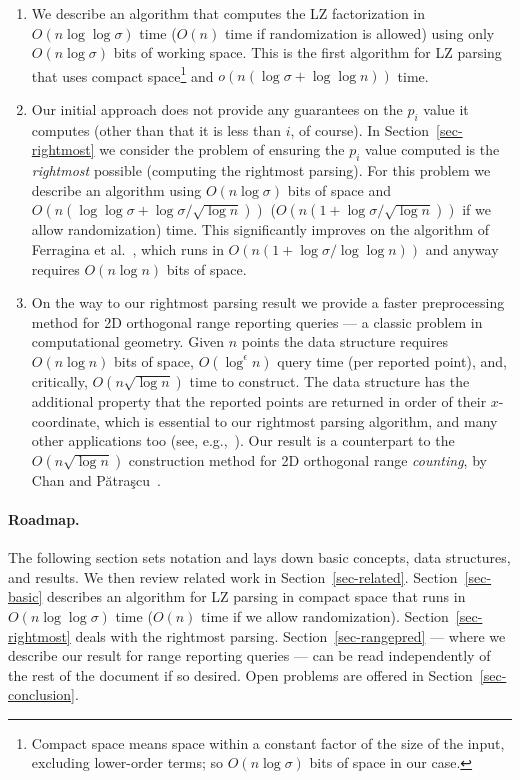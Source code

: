 \documentclass[11pt,runningheads]{llncs}
\begin{document}
\begin{enumerate}
\item We describe an algorithm that computes the LZ factorization in $O(n\log\log\sigma)$
time ($O(n)$ time if randomization is allowed) using only $O(n\log\sigma)$ bits of working space. 
This is the first algorithm for LZ parsing that uses compact space\footnote{Compact space means space within a constant
factor of the size of the input, excluding lower-order terms; so $O(n\log\sigma)$ bits of
space in our case.} and $o(n(\log\sigma+\log\log n))$ time.

\item Our initial approach does not provide any guarantees on the $p_i$
value it computes (other than that it is less than $i$, of course). In Section~\ref{sec-rightmost} 
we consider the problem of ensuring the $p_i$ value computed
is the {\em rightmost} possible (computing the rightmost parsing). For this
problem we describe an algorithm using $O(n\log\sigma)$ bits of space 
and $O(n(\log\log\sigma + \log\sigma/\sqrt{\log n}))$ ($O(n(1 + \log\sigma/\sqrt{\log n}))$ 
if we allow randomization)
time. This significantly improves on the algorithm of Ferragina et al.~\cite{fnv2013},
which runs in $O(n(1 + \log\sigma/\log\log n))$ and anyway requires $O(n\log n)$ bits of space.

\item On the way to our rightmost parsing result we provide a faster
preprocessing method for 2D orthogonal range reporting queries --- 
a classic problem in computational geometry. Given $n$ points 
the data structure requires $O(n\log n)$ bits of space, $O(\log^\epsilon n)$ query time (per reported point), 
and, critically, $O(n\sqrt{\log n})$ time to construct. The data structure 
has the additional property that the reported points are returned in order
of their $x$-coordinate, which is essential to our rightmost parsing algorithm,
and many other applications too (see, e.g.,~\cite{yhw2011,nn2012}). 
Our result is a counterpart to the $O(n\sqrt{\log n})$ 
construction method for 2D orthogonal range {\em counting}, 
by Chan and P{\u a}tra{\c s}cu~\cite{CP2010}.
\end{enumerate}

\paragraph{Roadmap.}
The following section sets notation and lays down basic concepts, data structures,
and results. We then review related work in Section~\ref{sec-related}.
Section~\ref{sec-basic} describes an algorithm for LZ parsing in compact
space that runs in $O(n\log\log\sigma)$ time ($O(n)$ time if 
we allow randomization). 
Section~\ref{sec-rightmost} deals with the rightmost
parsing. Section~\ref{sec-rangepred} --- where we describe our result for range reporting queries --- can be read 
independently of the rest of the document if so desired. 
Open problems are offered in Section~\ref{sec-conclusion}.
\end{document}

